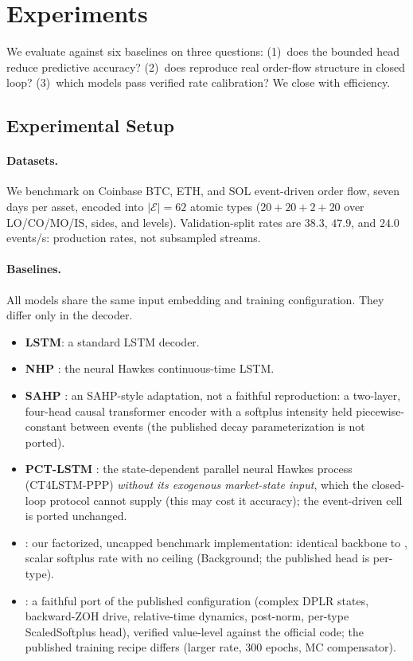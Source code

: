 \section{Experiments}
\label{sec:experiments}

We evaluate \ssppp{} against six baselines on three questions: (1)~does
the bounded head reduce predictive accuracy? (2)~does \ssppp{} reproduce
real order-flow structure in closed loop? (3)~which models pass verified
rate calibration? We close with efficiency.

\subsection{Experimental Setup}
\label{sec:setup}
\paragraph{Datasets.}
We benchmark on Coinbase BTC, ETH, and SOL event-driven order flow, seven
days per asset, encoded into $|\mathcal{E}|=62$ atomic types ($20+20+2+20$
over LO/CO/MO/IS, sides, and levels). Validation-split rates are $38.3$,
$47.9$, and $24.0$ events/s: production rates, not subsampled streams.

\paragraph{Baselines.}
All models share the same input embedding and training configuration. They
differ only in the decoder.
\begin{itemize}\setlength\itemsep{1pt}
\item \textbf{LSTM}: a standard LSTM decoder.

\item \textbf{NHP} \citep{Mei2017TheProcess}: the neural Hawkes
  continuous-time LSTM.
\item \textbf{SAHP} \citep{zhang2020self}: an SAHP-style adaptation, not a
  faithful reproduction: a two-layer, four-head causal transformer encoder
  with a softplus intensity held piecewise-constant between events (the
  published decay parameterization is not ported).
\item \textbf{PCT-LSTM} \citep{Shi2022StateSimulation}: the state-dependent
  parallel neural Hawkes process (CT4LSTM-PPP) \emph{without its exogenous
  market-state input}, which the closed-loop protocol cannot supply (this
  may cost it accuracy); the event-driven cell is ported unchanged.
\item \textbf{\sppp{}} \citep{chang2025ctssm}: our factorized, uncapped
  benchmark implementation: identical backbone to \ssppp{}, scalar softplus
  rate with no ceiling (Background; the published head is per-type).
\item \textbf{\spppub{}}: a faithful port of the published configuration
  (complex DPLR states, backward-ZOH drive, relative-time dynamics,
  post-norm, per-type ScaledSoftplus head), verified value-level against
  the official code; the published training recipe differs (larger rate,
  300 epochs, MC compensator).
\end{itemize}

